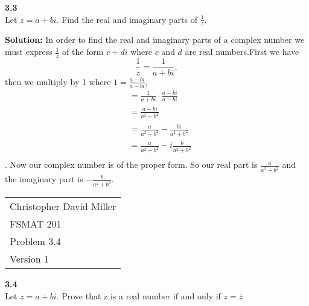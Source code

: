 \documentclass[12pt]{article}
\begin{document}
  
  \textbf{3.3} \\  %
  Let $z = a + bi$. Find the real and imaginary parts of $\frac{1}{z}.$
  
  \textbf{Solution:}
      In order to find the real and imaginary parts of a complex number we must express $\frac{1}{z}$ of the form $c+di$ where $c$ and $d$ are real numbers.First we have 
      $$
        \frac{1}{z}  = \frac{1}{a+bi},
      $$
      then we multiply by 1 where $1 = \frac{a-bi}{a-bi},$
      \begin{align*}
        &=\frac{1}{a+bi} \cdot \frac{a-bi}{a-bi}\\
        &=\frac{a-bi}{a^2+b^2} \\
        &=\frac{a}{a^2+b^2}-\frac{bi}{a^2+b^2} \\
        &=\frac{a}{a^2+b^2}-i\frac{b}{a^2+b^2} \\
      \end{align*}.
      Now our complex number is of the proper form. So our real part is $\frac{a}{a^2+b^2}$ and the imaginary part is $-\frac{b}{a^2+b^2}$.
      
      
      \newpage
      \begin{flushright}
        \begin{tabular}{l}
        Christopher David Miller \\  %
        FSMAT 201 \\  %
        Problem 3.4 \\  %
        Version 1 \\ %
        \end{tabular}
        \end{flushright}
        \vspace{20pt}  %
        
        
        \textbf{3.4} \\  %
        Let $z = a + bi$. Prove that z is a real number if and only if $z = \overline{z}$
        
\end{document}
